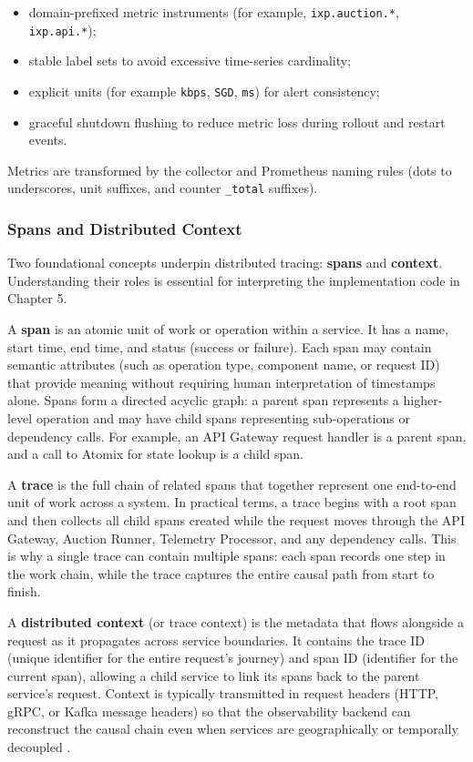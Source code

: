 \begin{itemize}
	\item domain-prefixed metric instruments (for example, \texttt{ixp.auction.*}, \texttt{ixp.api.*});
	\item stable label sets to avoid excessive time-series cardinality;
	\item explicit units (for example \texttt{kbps}, \texttt{SGD}, \texttt{ms}) for alert consistency;
	\item graceful shutdown flushing to reduce metric loss during rollout and restart events.
\end{itemize}

Metrics are transformed by the collector and Prometheus naming rules (dots to underscores, unit suffixes, and counter \texttt{\_total} suffixes).

\subsubsection{Spans and Distributed Context}

Two foundational concepts underpin distributed tracing: \textbf{spans} and \textbf{context}. Understanding their roles is essential for interpreting the implementation code in Chapter 5.

A \textbf{span} is an atomic unit of work or operation within a service. It has a name, start time, end time, and status (success or failure). Each span may contain semantic attributes (such as operation type, component name, or request ID) that provide meaning without requiring human interpretation of timestamps alone. Spans form a directed acyclic graph: a parent span represents a higher-level operation and may have child spans representing sub-operations or dependency calls. For example, an API Gateway request handler is a parent span, and a call to Atomix for state lookup is a child span.

A \textbf{trace} is the full chain of related spans that together represent one end-to-end unit of work across a system. In practical terms, a trace begins with a root span and then collects all child spans created while the request moves through the API Gateway, Auction Runner, Telemetry Processor, and any dependency calls. This is why a single trace can contain multiple spans: each span records one step in the work chain, while the trace captures the entire causal path from start to finish.

A \textbf{distributed context} (or trace context) is the metadata that flows alongside a request as it propagates across service boundaries. It contains the trace ID (unique identifier for the entire request's journey) and span ID (identifier for the current span), allowing a child service to link its spans back to the parent service's request. Context is typically transmitted in request headers (HTTP, gRPC, or Kafka message headers) so that the observability backend can reconstruct the causal chain even when services are geographically or temporally decoupled \citep{w3cTraceContext,opentelemetryDocsContextPropagation}.

